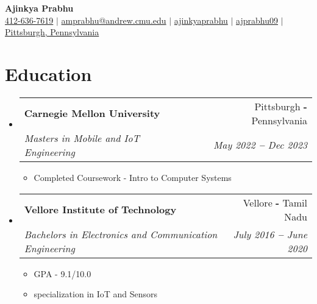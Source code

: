 \documentclass[12pt]{article}
\makeatletter
\newcommand{\resumeItem}[1]{
  \item\small{
    {#1}
  } 
  \vspace{-3pt}
}
\newcommand{\resumeSubheading}[4]{
  \item
    \begin{tabular*}{0.97\textwidth}[t]{l@{\extracolsep{\fill}}r}
      \textbf{\small#1} & \small#2 \\
      \textit{\small#3} & \textit{\small #4} \\
    \end{tabular*}
}
\newcommand{\resumeSubHeadingListStart}{\begin{itemize}[leftmargin=0.15in, label={}]}
\newcommand{\resumeSubHeadingListEnd}{\end{itemize}}
\newcommand{\resumeItemListStart}{\begin{itemize}\vspace{-8pt}}
\newcommand{\resumeItemListEnd}{\end{itemize}\vspace{-8pt}}
\makeatother
\begin{document}

\begin{flushleft}
    \textbf{\Large Ajinkya Prabhu} \\ \vspace{2 pt}
    \small
    \faMobile \hspace{.5pt} \href{tel:+1 412-636-7619}{412-636-7619}
    $|$
    \small
    \faAt \hspace{.5pt} \href{mailto:amprabhu@andrew.cmu.edu}{amprabhu@andrew.cmu.edu}
    $|$
    \small
    \faLinkedinSquare \hspace{.5pt} \href{https://www.linkedin.com/in/ajinkyaprabhu/}{ajinkyaprabhu}
    $|$
    \small
    \faGithub \hspace{.5pt} \href{https://github.com/ajprabhu09}{ajprabhu09}
    $|$
    \faMapMarker \hspace{.5pt} \href{https://goo.gl/maps/nDiixFmLt41dn9vq9} {Pittsburgh, Pennsylvania}
\end{flushleft}




    
   
\section{Education}
    \resumeSubHeadingListStart
    \resumeSubheading
      {Carnegie Mellon University}{Pittsburgh \textbf{-} Pennsylvania}
      {Masters in Mobile and IoT Engineering}{May 2022 \textbf{--} Dec 2023}
        \resumeItemListStart
            \resumeItem{Completed Coursework - Intro to Computer Systems}
        \resumeItemListEnd
    
    \resumeSubheading
      {Vellore Institute of Technology}{Vellore \textbf{-} Tamil Nadu}
      {Bachelors in Electronics and Communication Engineering}{July 2016 \textbf{--} June 2020}
        \resumeItemListStart
            \resumeItem{GPA - 9.1/10.0}
            \resumeItem{specialization in IoT and Sensors}
        \resumeItemListEnd 
    \resumeSubHeadingListEnd
    \vspace{0pt}
\end{document}
